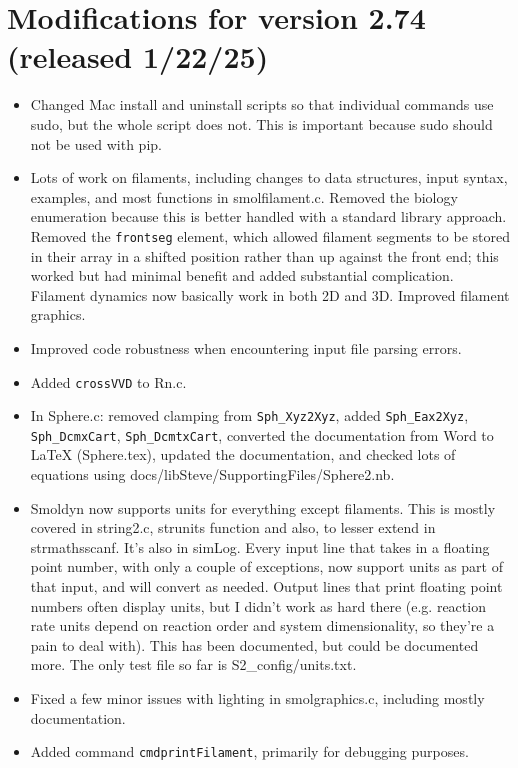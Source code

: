 \documentclass {scrbook}
\newcommand {\ttt} {\texttt}
\begin{document}
\section{Modifications for version 2.74 (released 1/22/25)}
\begin{itemize}
\item Changed Mac install and uninstall scripts so that individual commands use sudo, but the whole script does not. This is important because sudo should not be used with pip.
\item Lots of work on filaments, including changes to data structures, input syntax, examples, and most functions in smolfilament.c. Removed the biology enumeration because this is better handled with a standard library approach. Removed the \ttt{frontseg} element, which allowed filament segments to be stored in their array in a shifted position rather than up against the front end; this worked but had minimal benefit and added substantial complication. Filament dynamics now basically work in both 2D and 3D. Improved filament graphics.
\item Improved code robustness when encountering input file parsing errors.
\item Added \ttt{crossVVD} to Rn.c.
\item In Sphere.c: removed clamping from \ttt{Sph\_Xyz2Xyz}, added \ttt{Sph\_Eax2Xyz}, \ttt{Sph\_DcmxCart}, \ttt{Sph\_DcmtxCart}, converted the documentation from Word to LaTeX (Sphere.tex), updated the documentation, and checked lots of equations using docs/\-libSteve/\-SupportingFiles/\-Sphere2.nb.
\item Smoldyn now supports units for everything except filaments. This is mostly covered in string2.c, strunits function and also, to lesser extend in strmathsscanf. It's also in simLog. Every input line that takes in a floating point number, with only a couple of exceptions, now support units as part of that input, and will convert as needed. Output lines that print floating point numbers often display units, but I didn't work as hard there (e.g. reaction rate units depend on reaction order and system dimensionality, so they're a pain to deal with). This has been documented, but could be documented more. The only test file so far is S2\_config/units.txt.
\item Fixed a few minor issues with lighting in smolgraphics.c, including mostly documentation.
\item Added command \ttt{cmdprintFilament}, primarily for debugging purposes.

\end{itemize}
\end{document}
